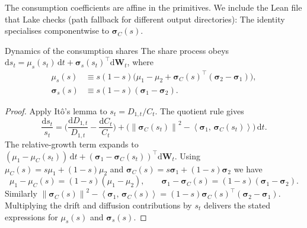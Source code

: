 ﻿\documentclass[11pt,letterpaper,oneside]{article}
\numberwithin{equation}{section}
\newcommand{\1}{\mathbf{1}}
\newcommand{\diff}{\mathrm{d}}
\newcommand{\norm}[1]{\left\lVert #1\right\rVert}
\newcommand{\ip}[2]{\left\langle #1,\,#2\right\rangle}
\begin{document}

\begin{leanproof}[title={Affine structure of $\mu_C$ and $\bm{\sigma}_C$}]
The consumption coefficients are affine in the primitives. We include the Lean file that Lake checks (path fallback for different output directories):
The identity specialises componentwise to $\bm{\sigma}_C(s)$.
\end{leanproof}

\begin{lemma}{Dynamics of the consumption share}{s}
The share process obeys $\diff s_t = \mu_s(s_t)\,\diff t + \bm{\sigma}_s(s_t)^{\top}\diff\bm{W}_t$, where
\begin{align}
  \mu_s(s) &\equiv s(1-s)\Big(\mu_1-\mu_2+\bm{\sigma}_C(s)^{\top}(\bm{\sigma}_2-\bm{\sigma}_1)\Big), \\
  \bm{\sigma}_s(s) &\equiv s(1-s)(\bm{\sigma}_1-\bm{\sigma}_2).
  \label{eq:s_drift}
\end{align}
\end{lemma}
\begin{proof}
Apply It\^o's lemma to $s_t = D_{1,t}/C_t$. The quotient rule gives
\[
  \frac{\diff s_t}{s_t} = \Big(\frac{\diff D_{1,t}}{D_{1,t}}-\frac{\diff C_t}{C_t}\Big) + \Big(\norm{\bm{\sigma}_C(s_t)}^2 - \ip{\bm{\sigma}_1}{\bm{\sigma}_C(s_t)}\Big)\,\diff t.
\]
The relative-growth term expands to $(\mu_1-\mu_C(s_t))\,\diff t + (\bm{\sigma}_1-\bm{\sigma}_C(s_t))^{\top}\diff\bm{W}_t$. Using $\mu_C(s) = s\mu_1 + (1-s)\mu_2$ and $\bm{\sigma}_C(s) = s\bm{\sigma}_1 + (1-s)\bm{\sigma}_2$ we have
\[
  \mu_1-\mu_C(s) = (1-s)(\mu_1-\mu_2),
  \qquad
  \bm{\sigma}_1-\bm{\sigma}_C(s) = (1-s)(\bm{\sigma}_1-\bm{\sigma}_2).
\]
Similarly $\norm{\bm{\sigma}_C(s)}^2 - \ip{\bm{\sigma}_1}{\bm{\sigma}_C(s)} = (1-s)\bm{\sigma}_C(s)^{\top}(\bm{\sigma}_2-\bm{\sigma}_1)$. Multiplying the drift and diffusion contributions by $s_t$ delivers the stated expressions for $\mu_s(s)$ and $\bm{\sigma}_s(s)$.
\end{proof}
\end{document}
